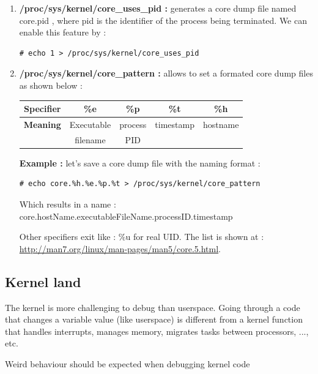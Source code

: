 \begin{enumerate}
		\begin{enumerate}
			\item \textbf{/proc/sys/kernel/core\_uses\_pid : } generates a core dump file named \og core.pid \fg, where pid is the identifier of the process being terminated. We can enable this feature by :
	\begin{lstlisting}[style=BashInputStyle]		
# echo 1 > /proc/sys/kernel/core_uses_pid			
\end{lstlisting}			
			\item \textbf{/proc/sys/kernel/core\_pattern : } allows to set a formated core dump files as shown below :
\begin{center}
	\begin{tabular}{|c|c|c|c|c|}
		\hline
		\rowcolor{LightCyan} 
			\textbf{Specifier} & \textbf{\%e} & \textbf{\%p} & \textbf{\%t} & \textbf{\%h}\\	   		
   		\hline
   		\textbf{Meaning} & Executable & process & timestamp & hostname\\
        	             & filename   & PID &  & \\
   		\hline
	\end{tabular}
\end{center}			
			
\textbf{\color{orange}Example :} let's save a core dump file with the naming format :	
	\begin{lstlisting}[style=BashInputStyle]
# echo core.%h.%e.%p.%t > /proc/sys/kernel/core_pattern
\end{lstlisting}	

Which results in a name : \og core.hostName.executableFileName.processID.timestamp \fg

Other specifiers exit like : \%u for real UID. The list is shown at : {\color{blue}\url{http://man7.org/linux/man-pages/man5/core.5.html}}.
		\end{enumerate}
\end{enumerate}

\subsection{Kernel land}
The kernel is more challenging to debug than userspace. Going through a code that changes a variable value (like userspace) is different from a kernel function that handles interrupts, manages memory, migrates tasks between processors, ..., etc.\\
\begin{center}
Weird behaviour should be expected when debugging kernel code
\end{center}  


